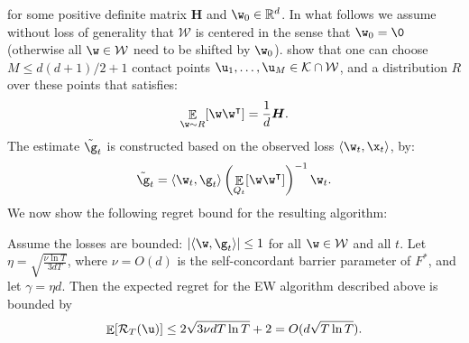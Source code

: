 \documentclass{colt2018} %
\DeclareMathOperator*{\E}{\mathbb{E}}
\renewcommand{\top}{\intercal}
\newcommand{\reals}{\mathbb{R}}
\newcommand{\domainw}{\mathcal{W}}
\newcommand{\inner}[2]{\langle #1, #2 \rangle}  %
\newcommand{\regret}{\mathcal{R}}
\begin{document}
for some positive definite matrix $\boldsymbol{H}$ and $\w_0 \in \reals^d$. In what follows we assume without loss
of generality that $\domainw$ is
centered in the sense that $\w_0=\0$ (otherwise all $\w \in \domainw$ need to be 
shifted by $\w_0$). \citet{Bubeck12} show
that one can choose $M \leq d(d+1)/2 + 1$ contact points $\u_1,\ldots,\u_M \in 
\mathcal{K} \cap 
\domainw$, and a distribution
$R$ over these points that satisfies:
\begin{equation}
  \E_{\w \sim R} [\w\w^\top] = \frac{1}{d}
  \boldsymbol{H}.
\label{eq:property_of_R}
\end{equation}
% 
The estimate $\tilde{\g}_t$ is constructed based on the
observed loss $\inner{\w_t}{\x_t}$, by: 
\[
  \tilde{\g}_t = \inner{\w_t}{\g_t} \left(\E_{Q_t}[\w\w^\top]\right)^{-1} \w_t.
\]
We now show the following regret bound for the resulting algorithm:
\begin{theorem}
Assume the losses are bounded: $|\inner{\w}{\g_t}| \leq 1$ for all $\w \in \domainw$
and all $t$. Let $\eta = \sqrt{\frac{\nu \ln T}{3 d T}}$,
where $\nu = O(d)$ is the self-concordant barrier parameter of $F^*$,
and let $\gamma = \eta d$. Then the expected regret for the EW algorithm
described above is bounded by
\[
  \E[\regret_T(\u)] \leq 2 \sqrt{3\nu d T \ln T} +2
= O(d \sqrt{T \ln T}).
\]
\end{theorem}
\end{document}
